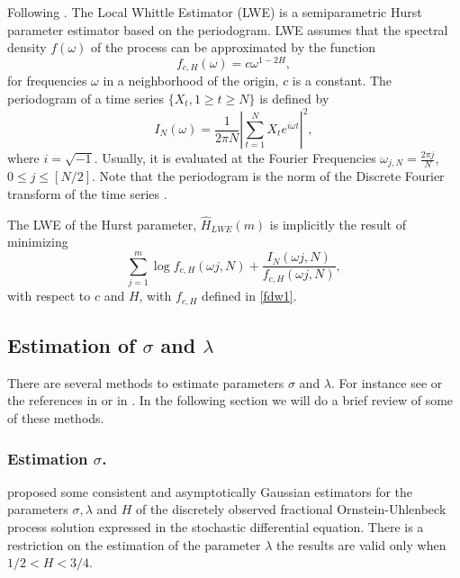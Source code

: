 \documentclass[smallextended]{svjour3}
\begin{document}
        Following \cite{pa-etal}. The Local Whittle Estimator (LWE) is a 
    semiparametric Hurst parameter estimator based on the periodogram.
    LWE assumes that the spectral density $f(\omega)$ of the process can be
    approximated by the function
    \begin{equation}\label{fdw1}
        f_{c,H}(\omega) = c\omega^{1-2H},
    \end{equation}
    for frequencies $\omega$ in a neighborhood of the origin, $c$ is a constant.
    The periodogram of a time series
    $\{X_t , 1 \ge t \ge N \}$ is defined by
    $$
        I_N (\omega)  = 
            \frac{1}{2\pi N}
            \left|
                \sum_{t=1}^N X_te^{i\omega t}
            \right|^2,
    $$
    where $i=\sqrt{-1}$. Usually, it is evaluated at the Fourier Frequencies
    $\omega_{j,N} = \frac{2\pi j}{N}$, $0 \le j \le [N/2]$.  Note that the
    periodogram is the norm of the Discrete Fourier transform of the time series
    \citep[see, for example,][sect. 6.1.2]{priestley}.

    The LWE of the Hurst parameter, $\hat{H}_{LWE}(m)$  is implicitly the result
    of minimizing
    $$
        \sum_{j=1}^m  
            \log f_{c,H} 
                (\omega j, N) 
                + 
                \frac{I_N(\omega j, N)}{ f_{c,H}(\omega j,N )},
    $$
    with respect to $c$ and $H$, with $f_{c,H}$ defined in \eqref{fdw1}.

\subsection{Estimation of $\sigma$ and  $\lambda$}

    There are several methods to estimate parameters $\sigma$ and  $\lambda$. 
    For instance see \cite{ra} or the references in \cite{ne-ti} or in 
    \cite{ku-mi}. In the following section we will do a brief review of
    some of these methods.

    \subsubsection{Estimation $\sigma$.}
    \label{sect-est}

    \citet{br-ia} proposed some consistent and asymptotically
    Gaussian estimators for the parameters $\sigma,\lambda$ and $H$ of
    the discretely observed fractional Ornstein-Uhlenbeck process solution
    expressed in the stochastic differential equation.
    There is a restriction on  the estimation of the parameter $\lambda$
    \textemdash the results are valid only when $ 1 / 2 < H < 3 / 4$. 
\end{document}
